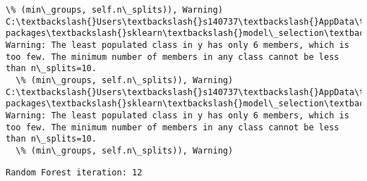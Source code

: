 \documentclass[11pt]{article}
\begin{document}
\begin{Verbatim}[commandchars=\\\{\}]
  \% (min\_groups, self.n\_splits)), Warning)
C:\textbackslash{}Users\textbackslash{}s140737\textbackslash{}AppData\textbackslash{}Local\textbackslash{}Continuum\textbackslash{}anaconda3\textbackslash{}lib\textbackslash{}site-packages\textbackslash{}sklearn\textbackslash{}model\_selection\textbackslash{}\_split.py:605: Warning: The least populated class in y has only 6 members, which is too few. The minimum number of members in any class cannot be less than n\_splits=10.
  \% (min\_groups, self.n\_splits)), Warning)
C:\textbackslash{}Users\textbackslash{}s140737\textbackslash{}AppData\textbackslash{}Local\textbackslash{}Continuum\textbackslash{}anaconda3\textbackslash{}lib\textbackslash{}site-packages\textbackslash{}sklearn\textbackslash{}model\_selection\textbackslash{}\_split.py:605: Warning: The least populated class in y has only 6 members, which is too few. The minimum number of members in any class cannot be less than n\_splits=10.
  \% (min\_groups, self.n\_splits)), Warning)

    \end{Verbatim}

    \begin{Verbatim}[commandchars=\\\{\}]
Random Forest iteration: 12 

    \end{Verbatim}
\end{document}
